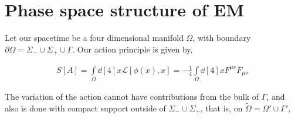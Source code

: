 \section{Phase space structure of EM}

Let our spacetime be a four dimensional manifold $\Omega$, with boundary $\partial\Omega = \Sigma_-\cup\Sigma_+\cup\Gamma$. 
Our action principle is given by,

\begin{align}
    S[A] = \int\limits_\Omega\dd[4]{x}\mathcal L[\phi(x),x] = -\frac14\int\limits_\Omega\dd[4]{x} F^{\mu\nu}F_{\mu\nu}
\end{align}

The variation of the action cannot have contributions from the bulk of $\Gamma$, and also is done with compact support 
outside of $\Sigma_-\cup\Sigma_+$, that is, on $\tilde\Omega = \Omega'\cup\Gamma'$,

